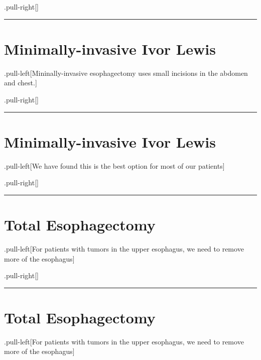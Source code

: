 \documentclass[
]{article}
\begin{document}
.pull-right{[}{]}

\begin{center}\rule{0.5\linewidth}{0.5pt}\end{center}

\hypertarget{minimally-invasive-ivor-lewis}{%
\section{Minimally-invasive Ivor
Lewis}\label{minimally-invasive-ivor-lewis}}

.pull-left{[}Mininally-invasive esophagectomy uses small incisions in
the abdomen and chest.{]}

.pull-right{[}{]}

\begin{center}\rule{0.5\linewidth}{0.5pt}\end{center}

\hypertarget{minimally-invasive-ivor-lewis-1}{%
\section{Minimally-invasive Ivor
Lewis}\label{minimally-invasive-ivor-lewis-1}}

.pull-left{[}We have found this is the best option for most of our
patients{]}

.pull-right{[}{]}

\begin{center}\rule{0.5\linewidth}{0.5pt}\end{center}

\hypertarget{total-esophagectomy}{%
\section{Total Esophagectomy}\label{total-esophagectomy}}

.pull-left{[}For patients with tumors in the upper esophagus, we need to
remove more of the esophagus{]}

.pull-right{[}{]}

\begin{center}\rule{0.5\linewidth}{0.5pt}\end{center}

\hypertarget{total-esophagectomy-1}{%
\section{Total Esophagectomy}\label{total-esophagectomy-1}}

.pull-left{[}For patients with tumors in the upper esophagus, we need to
remove more of the esophagus{]}
\end{document}
